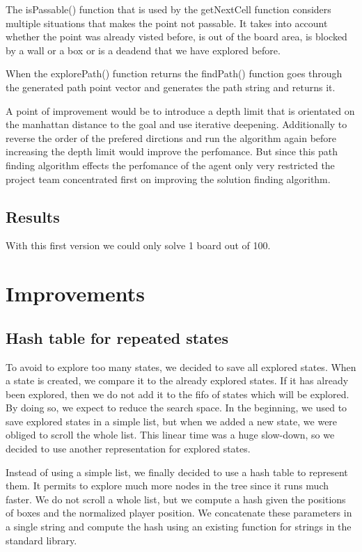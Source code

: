 \documentclass[a4paper,10pt]{article}
\begin{document}
	The isPassable() function that is used by the getNextCell function considers multiple situations that makes the point not 		passable. It takes into account whether the point was already visted before, is out of the board area, is blocked by a wall 		or a box or is a deadend that we have explored before.

	When the explorePath() function returns the findPath() function goes through the generated path point vector and generates 		the path string and returns it.

	A point of improvement would be to introduce a depth limit that is orientated on the manhattan distance to the goal and use 		iterative deepening. Additionally to reverse the order of the prefered dirctions and run the algorithm again before 		increasing the depth limit would improve the perfomance. But since this path finding algorithm effects the perfomance of the 		agent only very restricted the project team concentrated first on improving the solution finding algorithm.

	\subsection{Results}
	With this first version we could only solve 1 board out of 100. 

\section{Improvements}
    \subsection{Hash table for repeated states}
    To avoid to explore too many states, we decided to save all explored states. 
    When a state is created, we compare it to the already explored states. 
    If it has already been explored, then we do not add it to the fifo of states which will be explored. 
    By doing so, we expect to reduce the search space. 
    In the beginning, we used to save explored states in a simple list, but when we added a new state, we were obliged to scroll the whole list. 
    This linear time was a huge slow-down, so we decided to use another representation for explored states.
    
    Instead of using a simple list, we finally decided to use a hash table to represent them. 
    It permits to explore much more nodes in the tree since it runs much faster. 
    We do not scroll a whole list, but we compute a hash given the positions of boxes and the normalized player position. 
    We concatenate these parameters in a single string and compute the hash using an existing function for strings in the standard library.
\end{document}
